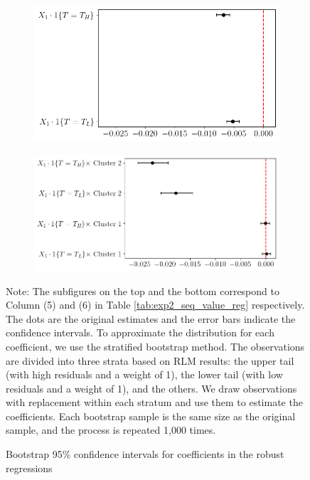 \documentclass[
  12pt,
]{article}
\begin{document}
\begin{figure} 
\centering
\begin{subfigure}{0.85\textwidth}
  \hfill
  \includegraphics[width=0.85\linewidth]{figures/exp2_bootstrap_ci_baseline.png}
\end{subfigure}
\begin{subfigure}{0.85\textwidth} 
  \hfill
  \includegraphics[width=\linewidth]{figures/exp2_bootstrap_ci_label.png} 
\end{subfigure}
\caption{Bootstrap 95\% confidence intervals for coefficients in the robust regressions}
\vspace*{4pt}
\centering

\begin{minipage}{1.0\textwidth}
{\par\footnotesize Note: The subfigures on the top and the bottom correspond to Column (5) and (6) in Table \ref{tab:exp2_seq_value_reg} respectively. The dots are the original estimates and the error bars indicate the confidence intervals. To approximate the distribution for each coefficient, we use the stratified bootstrap method. The observations are divided into three strata based on RLM results: the upper tail (with high residuals and a weight of 1), the lower tail (with low residuals and a weight of 1), and the others. We draw observations with replacement within each stratum and use them to estimate the coefficients. Each bootstrap sample is the same size as the original sample, and the process is repeated 1,000 times. }
\end{minipage}
\label{fig:exp2_bootstrap_ci}
\end{figure}
\end{document}
